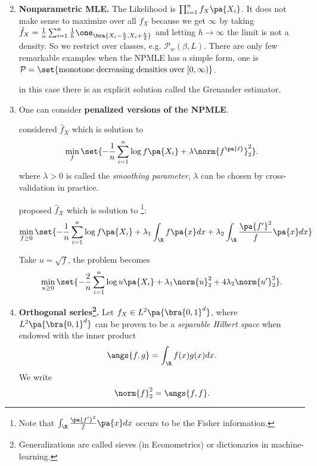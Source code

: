 
\begin{enumerate}
\setcounter{enumi}{1}
\item \textbf{Nonparametric MLE.}
The Likelihood is $\prod_{i=1}^n f_X\pa{X_i}$. It does not make sense to maximize over all $f_X$ because we get $\infty$ by taking $\hat{f}_X = \frac{1}{n}\sum_{i=1}^n \frac{1}{h}\one_{\bra{X_i -\frac{h}{2}, X_i + \frac{h}{2}}}$ and letting $h\rightarrow \infty$ the limit is not a density.
So we restrict over classes, e.g. $\mathcal P_w(\beta,L)$. There are only few remarkable examples when the NPMLE has a simple form, one is $\mathcal P=\set{\mathrm{monotone\;decreasing\;densities\;over\;}[0,\infty ) }$.

in this case there is an explicit solution called the Grenander estimator.

\item One can consider \textbf{penalized versions of the NPMLE}.

\cite{geman_hwang} considered $\hat{f}_X$ which is solution to
\begin{equation}
  \min_{f} \set{-\frac{1}{n} \sum_{i=1}^n \log f\pa{X_i} + \lambda \norm{f^{\pa{\ell}}}_2^2}.
\end{equation} where $\lambda>0$ is called the \textit{smoothing parameter}, $\lambda$ can be chosen by cross-validation in practice.

\cite{good_gaskins} proposed $\hat{f}_X$ which is solution to \footnote{Note that $\int_\R \frac{\pa{f'}^2}{f}\pa{x} dx$ occurs to be the Fisher information.}:
\begin{equation}
\min_{f\geq 0} \set{-\frac{1}{n} \sum_{i=1}^n  \log f\pa{X_i}  + \lambda_1 \int_\R f\pa{x} dx+ \lambda _2 \int_\R \frac{\pa{f'}^2}{f}\pa{x}dx}
\end{equation}

Take $u= \sqrt{f}$, the problem becomes
\begin{equation}
  \min_{u\geq 0} \set{-\frac{2}{n}\sum_{i=1}^n \log u \pa{X_i} + \lambda_1\norm{u}_2^2 + 4\lambda_2\norm{u'}_2^2 }.
\end{equation}

\item \textbf{Orthogonal series\footnote{Generalizations are called sieves (in Econometrics) or dictionaries in machine-learning.}.}
Let $f_X\in L^2\pa{\bra{0,1}^d}$, where $L^2\pa{\bra{0,1}^d}$ can be proven to be a \textit{separable Hilbert space} when endowed with the inner product
\begin{equation}
\angs{f,g}=\int_\R f(x)g(x) dx.
\end{equation}
We write
\begin{equation}
\norm{f}_2^2 = \angs{f,f}.
\end{equation}


\end{enumerate}
